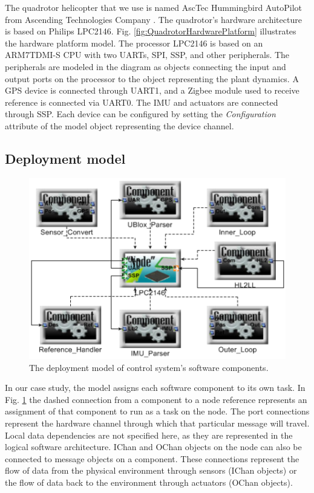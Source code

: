\documentclass[10pt, conference, compsocconf]{IEEEtran}
\begin{document}
The quadrotor helicopter that we use is named AscTec Hummingbird AutoPilot from Ascending Technologies Company \cite{asctech:hummingbird}. The quadrotor's hardware architecture is based on Philips LPC2146. Fig. \ref{fig:QuadrotorHardwarePlatform} illustrates the hardware platform model. The processor LPC2146 is based on an ARM7TDMI-S CPU with two UARTs, SPI, SSP, and other peripherals. The peripherals are modeled in the diagram as objects connecting the input and output ports on the processor to the object representing the plant dynamics. A GPS device is connected through UART1, and a Zigbee module used to receive reference is connected via UART0. The IMU and actuators are connected through SSP. Each device can be configured by setting the \emph{Configuration} attribute of the model object representing the device channel. 

\subsection{Deployment model}

\begin{figure}[!t]
\centering
\includegraphics[width=0.80\columnwidth]{figures/QuadrotorDeployment.png}
\caption{The deployment model of control system's software components.}
\label{fig:QuadrotorDeployment}
\end{figure}

In our case study, the model assigns each software component to its own task. In Fig. \ref{fig:QuadrotorDeployment} the dashed connection from a component to a node reference represents an assignment of that component to run as a task on the node. The port connections represent the hardware channel through which that particular message will travel. Local data dependencies are not specified here, as they are represented in the logical software architecture. IChan and OChan objects on the node can also be connected to message objects on a component. These connections represent the flow of data from the physical environment through sensors (IChan objects) or the flow of data back to the environment through actuators (OChan objects).
\end{document}
